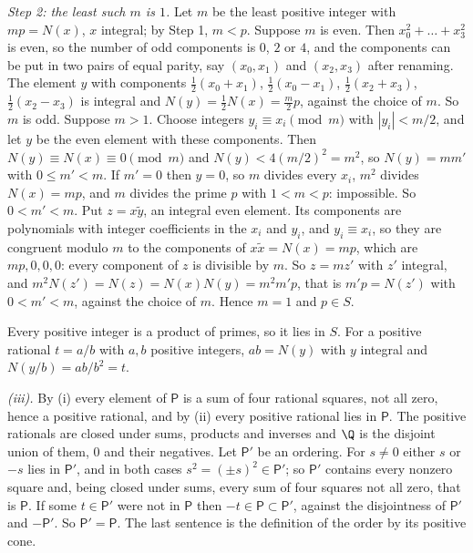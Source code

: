 \emph{Step 2: the least such $m$ is $1$.} Let $m$ be the least positive integer with $mp = N(x)$, $x$ integral; by Step 1, $m < p$. Suppose $m$ is even. Then $x_{0}^{2} + \dots + x_{3}^{2}$ is even, so the number of odd components is $0$, $2$ or $4$, and the components can be put in two pairs of equal parity, say $(x_{0}, x_{1})$ and $(x_{2}, x_{3})$ after renaming. The element $y$ with components $\tfrac12(x_{0} + x_{1})$, $\tfrac12(x_{0} - x_{1})$, $\tfrac12(x_{2} + x_{3})$, $\tfrac12(x_{2} - x_{3})$ is integral and $N(y) = \tfrac12 N(x) = \tfrac{m}{2}p$, against the choice of $m$. So $m$ is odd. Suppose $m > 1$. Choose integers $y_{i} \equiv x_{i} \pmod m$ with $|y_{i}| < m/2$, and let $y$ be the even element with these components. Then $N(y) \equiv N(x) \equiv 0 \pmod m$ and $N(y) < 4(m/2)^{2} = m^{2}$, so $N(y) = mm'$ with $0 \le m' < m$. If $m' = 0$ then $y = 0$, so $m$ divides every $x_{i}$, $m^{2}$ divides $N(x) = mp$, and $m$ divides the prime $p$ with $1 < m < p$: impossible. So $0 < m' < m$. Put $z = x\tilde{y}$, an integral even element. Its components are polynomials with integer coefficients in the $x_{i}$ and $y_{i}$, and $y_{i} \equiv x_{i}$, so they are congruent modulo $m$ to the components of $x\tilde{x} = N(x) = mp$, which are $mp, 0, 0, 0$: every component of $z$ is divisible by $m$. So $z = mz'$ with $z'$ integral, and $m^{2}N(z') = N(z) = N(x)N(y) = m^{2}m'p$, that is $m'p = N(z')$ with $0 < m' < m$, against the choice of $m$. Hence $m = 1$ and $p \in S$.

Every positive integer is a product of primes, so it lies in $S$. For a positive rational $t = a/b$ with $a, b$ positive integers, $ab = N(y)$ with $y$ integral and $N(y/b) = ab/b^{2} = t$.

\emph{(iii).} By (i) every element of $\mathsf{P}$ is a sum of four rational squares, not all zero, hence a positive rational, and by (ii) every positive rational lies in $\mathsf{P}$. The positive rationals are closed under sums, products and inverses and $\Q$ is the disjoint union of them, $0$ and their negatives. Let $\mathsf{P}'$ be an ordering. For $s \ne 0$ either $s$ or $-s$ lies in $\mathsf{P}'$, and in both cases $s^{2} = (\pm s)^{2} \in \mathsf{P}'$; so $\mathsf{P}'$ contains every nonzero square and, being closed under sums, every sum of four squares not all zero, that is $\mathsf{P}$. If some $t \in \mathsf{P}'$ were not in $\mathsf{P}$ then $-t \in \mathsf{P} \subset \mathsf{P}'$, against the disjointness of $\mathsf{P}'$ and $-\mathsf{P}'$. So $\mathsf{P}' = \mathsf{P}$. The last sentence is the definition of the order by its positive cone.

